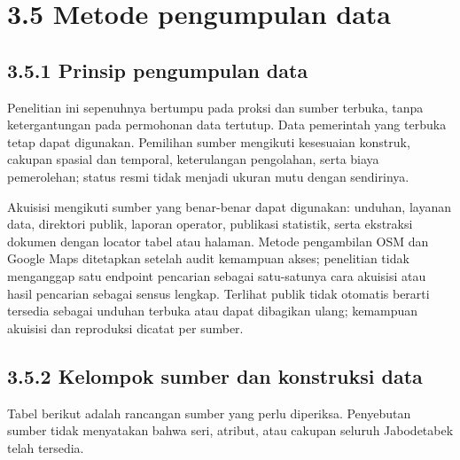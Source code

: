 \documentclass[
  indonesian,
  11pt,
  a4paper,
  oneside,
  openany]{report}
\begin{document}
\section{3.5 Metode pengumpulan data}\label{metode-pengumpulan-data}

\subsection{3.5.1 Prinsip pengumpulan
data}\label{prinsip-pengumpulan-data}

Penelitian ini sepenuhnya bertumpu pada proksi dan sumber terbuka, tanpa
ketergantungan pada permohonan data tertutup. Data pemerintah yang
terbuka tetap dapat digunakan. Pemilihan sumber mengikuti kesesuaian
konstruk, cakupan spasial dan temporal, keterulangan pengolahan, serta
biaya pemerolehan; status resmi tidak menjadi ukuran mutu dengan
sendirinya.

Akuisisi mengikuti sumber yang benar-benar dapat digunakan: unduhan,
layanan data, direktori publik, laporan operator, publikasi statistik,
serta ekstraksi dokumen dengan locator tabel atau halaman. Metode
pengambilan OSM dan Google Maps ditetapkan setelah audit kemampuan
akses; penelitian tidak menganggap satu endpoint pencarian sebagai
satu-satunya cara akuisisi atau hasil pencarian sebagai sensus lengkap.
Terlihat publik tidak otomatis berarti tersedia sebagai unduhan terbuka
atau dapat dibagikan ulang; kemampuan akuisisi dan reproduksi dicatat
per sumber.

\subsection{3.5.2 Kelompok sumber dan konstruksi
data}\label{kelompok-sumber-dan-konstruksi-data}

Tabel berikut adalah rancangan sumber yang perlu diperiksa. Penyebutan
sumber tidak menyatakan bahwa seri, atribut, atau cakupan seluruh
Jabodetabek telah tersedia.
\end{document}

